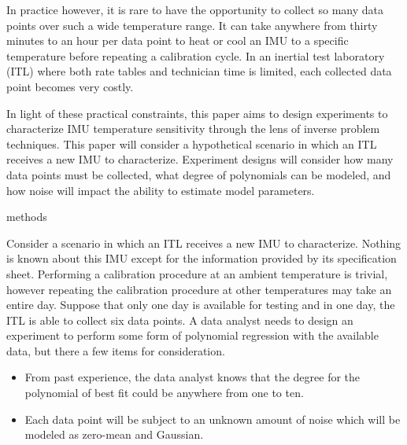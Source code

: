 In practice however, it is rare to have the opportunity to collect so many data points over such a wide temperature range. It can take anywhere from thirty minutes to an hour per data point to heat or cool an IMU to a specific temperature before repeating a calibration cycle. In an inertial test laboratory (ITL) where both rate tables and technician time is limited, each collected data point becomes very costly. 

In light of these practical constraints, this paper aims to design experiments to characterize IMU temperature sensitivity through the lens of inverse problem techniques. This paper will consider a hypothetical scenario in which an ITL receives a new IMU to characterize. Experiment designs will consider how many data points must be collected, what degree of polynomials can be modeled, and how noise will impact the ability to estimate model parameters. 


methods

Consider a scenario in which an ITL receives a new IMU to characterize. Nothing is known about this IMU except for the information provided by its specification sheet. Performing a calibration procedure at an ambient temperature is trivial, however repeating the calibration procedure at other temperatures may take an entire day. Suppose that only one day is available for testing and in one day, the ITL is able to collect six data points. A data analyst needs to design an experiment to perform some form of polynomial regression with the available data, but there a few items for consideration.

\begin{itemize}
	\item From past experience, the data analyst knows that the degree for the polynomial of best fit could be anywhere from one to ten. 
	\item Each data point will be subject to an unknown amount of noise which will be modeled as zero-mean and Gaussian.
\end{itemize}